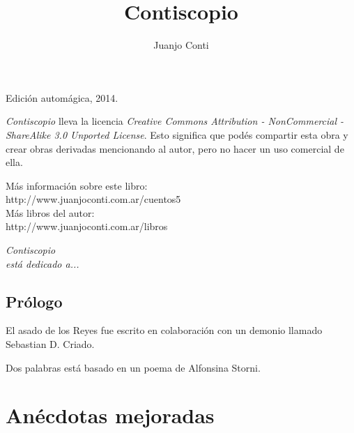 \documentclass[12pt,twoside,openright,a5paper]{book}
\title{Contiscopio}
\author{Juanjo Conti}
\date{}
\begin{document}
\pagestyle{plain}

\maketitle

\cleardoublepage

\thispagestyle{empty}
\noindent
Edición automágica, 2014.\\

\vspace{0.5cm}

\noindent
\emph{Contiscopio} lleva la licencia 
\emph{Creative Commons Attribution - NonCommercial - ShareAlike 3.0 Unported License}.
Esto significa que podés compartir esta obra y crear obras derivadas
mencionando al autor, pero no ha\-cer un uso comercial de ella.

\vfill

\noindent
Más información sobre este libro:\\
http://www.juanjoconti.com.ar/cuentos5\\

\noindent
Más libros del autor:\\
http://www.juanjoconti.com.ar/libros

\cleardoublepage

\noindent
\begin{flushright}
\emph{
\emph{Contiscopio}\\
está dedicado a...
}
\end{flushright}

\cleardoublepage

\renewcommand*\contentsname{Índice}

\tableofcontents

\chapter*{Prólogo} 

El asado de los Reyes fue escrito en colaboración con un demonio llamado Sebastian D. Criado.

Dos palabras está basado en un poema de Alfonsina Storni.

\part*{Anécdotas mejoradas} 


\end{document}
